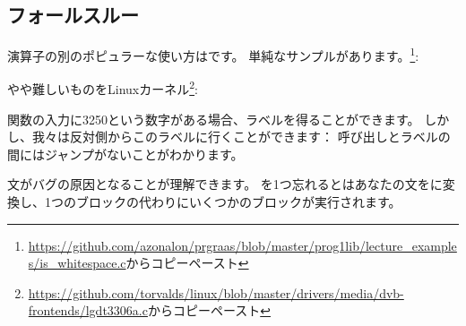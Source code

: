 ﻿\subsection{フォールスルー}

演算子の別のポピュラーな使い方はです。
単純なサンプルがあります。\footnote{\url{https://github.com/azonalon/prgraas/blob/master/prog1lib/lecture_examples/is_whitespace.c}からコピーペースト}:



やや難しいものをLinuxカーネル\footnote{\url{https://github.com/torvalds/linux/blob/master/drivers/media/dvb-frontends/lgdt3306a.c}からコピーペースト}:





関数の入力に3250という数字がある場合、ラベルを得ることができます。
しかし、我々は反対側からこのラベルに行くことができます：
\printf 呼び出しとラベルの間にはジャンプがないことがわかります。

文がバグの原因となることが理解できます。
を1つ忘れるとはあなたの文をに変換し、1つのブロックの代わりにいくつかのブロックが実行されます。
